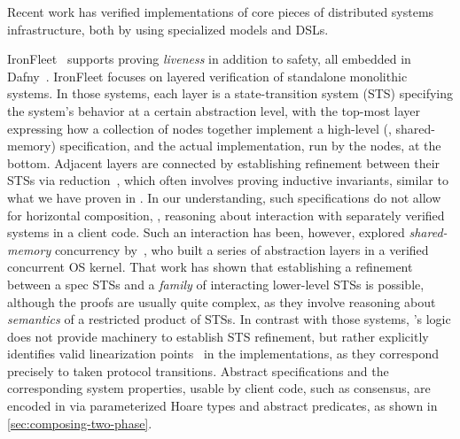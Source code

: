 Recent work has verified implementations of core pieces of distributed
systems infrastructure, both by using specialized models and DSLs.


IronFleet~\cite{Hawblitzel-al:SOSP15} supports proving \emph{liveness}
in addition to safety, all embedded in Dafny~\cite{Leino:LPAR10}.
%
%
IronFleet focuses on layered verification of standalone monolithic
systems.
%
In those systems, each layer is a state-transition system (STS)
specifying the system's behavior at a certain abstraction level, with
the top-most layer expressing how a collection of nodes together
implement a high-level (\eg, shared-memory) specification,
%
and the actual implementation, run by the nodes, at the bottom.
%
Adjacent layers are connected by establishing refinement between
their %
STSs via reduction~\cite{Lipton-CACM75}, which often involves proving
inductive invariants, similar to what we have proven in \disel.
%
%
In our understanding, such specifications do not allow for horizontal
composition, \ie, reasoning about interaction with separately verified
systems in a client code.
%
Such an interaction has been, however, explored \wrt
\emph{shared-memory} concurrency by~\citet{Gu-al:OSDI16}, who built a
series of abstraction layers in a verified concurrent OS kernel. That
work has shown that establishing a refinement between a spec STSs and
a \emph{family} of interacting lower-level STSs is possible, although
the proofs are usually quite complex, as they involve reasoning about
\emph{semantics} of a restricted product of STSs.
%
In contrast with those systems, \disel's logic does not provide
machinery to establish STS refinement, but rather explicitly
identifies valid linearization points~\cite{herlihy:linearizability} in
the implementations, as they correspond precisely to taken protocol
transitions.
%
Abstract specifications and the corresponding system properties, usable
by client code, such as consensus, are encoded in \disel via
parameterized Hoare types and abstract predicates, as shown in
\cref{sec:composing-two-phase}.

